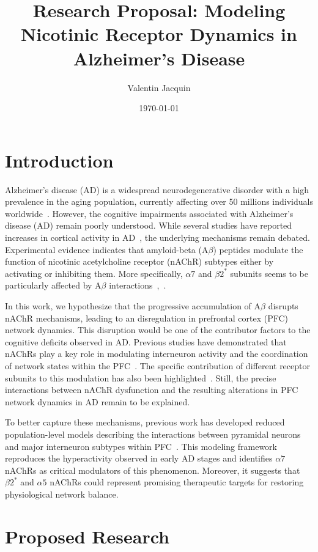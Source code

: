 \documentclass[11pt,a4paper]{article}
\title{\textbf{Research Proposal: Modeling Nicotinic Receptor Dynamics in Alzheimer's Disease}}
\author{Valentin Jacquin}
\date{\today}
\begin{document}
\maketitle

\section{Introduction}

Alzheimer's disease (AD) is a widespread neurodegenerative disorder with a high prevalence in the aging population, currently affecting over 50 millions individuals worldwide~\cite{Breijyeh2020}. However, the cognitive impairments associated with Alzheimer's disease (AD) remain poorly understood. While several studies have reported increases in cortical activity in AD~\cite{Palop2007}, the underlying mechanisms remain debated. Experimental evidence indicates that amyloid-beta (A$\beta$) peptides modulate the function of nicotinic acetylcholine receptor (nAChR) subtypes either by activating or inhibiting them. More specifically, $\alpha7$ and $\beta2^*$ subunits seems to be particularly affected by A$\beta$ interactions~\cite{Lombardo2015},~\cite{Parri2011}.

In this work, we hypothesize that the progressive accumulation of A$\beta$ disrupts nAChR mechanisms, leading to an disregulation in prefrontal cortex (PFC) network dynamics. This disruption would be one of the contributor factors to the cognitive deficits observed in AD. Previous studies have demonstrated that nAChRs play a key role in modulating interneuron activity and the coordination of network states within the PFC~\cite{Koukouli2017}. The specific contribution of different receptor subunits to this modulation has also been highlighted~\cite{Maskos2014}. Still, the precise interactions between nAChR dysfunction and the resulting alterations in PFC network dynamics in AD remain to be explained.

To better capture these mechanisms, previous work has developed reduced population-level models describing the interactions between pyramidal neurons and major interneuron subtypes within PFC~\cite{Koukouli2025}. This modeling framework reproduces the hyperactivity observed in early AD stages and identifies $\alpha7$ nAChRs as critical modulators of this phenomenon. Moreover, it suggests that $\beta2^*$ and $\alpha5$ nAChRs could represent promising therapeutic targets for restoring physiological network balance.

\section{Proposed Research}
\end{document}
